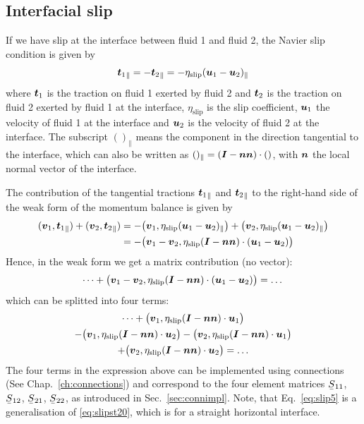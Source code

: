 \subsection{Interfacial slip}
If we have slip at the interface between fluid 1 and fluid 2, the 
 Navier slip condition is given by
\begin{equation}
   {\boldsymbol{t}_1}_\| = -{\boldsymbol{t}_2}_\| = 
   -\eta_\text{slip} (\boldsymbol{u}_1 - \boldsymbol{u}_2)_\|
   \label{eq:slip3}
\end{equation}
where $\boldsymbol{t}_1$ is the traction on fluid 1 exerted by fluid 2 and 
$\boldsymbol{t}_2$ is the traction on fluid 2 exerted by fluid 1 at the interface,
$\eta_\text{slip}$ is the slip coefficient,
$\boldsymbol{u}_1$ the velocity of fluid 1 at the interface and $\boldsymbol{u}_2$ is
the velocity of fluid 2 at the interface. The subscript $()_\|$ means the
component in the direction tangential to the interface, which can also be written
as $()_\|=(\boldsymbol{I}-\boldsymbol{n}\boldsymbol{n})\cdot()$, with $\boldsymbol{n}$ the local normal vector of the interface.

The contribution of the tangential tractions ${\boldsymbol{t}_1}_\|$ and ${\boldsymbol{t}_2}_\|$
to the right-hand side of the weak form of the momentum balance is given by
\begin{equation} 
\begin{split}
   (\boldsymbol{v}_1, {\boldsymbol{t}_1}_\|)+(\boldsymbol{v}_2, {\boldsymbol{t}_2}_\|) &=
-\big(\boldsymbol{v}_1,\eta_\text{slip} (\boldsymbol{u}_1 - \boldsymbol{u}_2)_\|\big)
+\big(\boldsymbol{v}_2,\eta_\text{slip} (\boldsymbol{u}_1 - \boldsymbol{u}_2)_\|\big)\\
&=-\big(\boldsymbol{v}_1-\boldsymbol{v}_2,\eta_\text{slip} (\boldsymbol{I}-\boldsymbol{n}\boldsymbol{n})\cdot
                            (\boldsymbol{u}_1 - \boldsymbol{u}_2)\big)
\end{split}
   \label{eq:slip4}
\end{equation}
Hence, in the weak form we get a matrix contribution (no vector):
\begin{equation}
  \dots + \big(\boldsymbol{v}_1-\boldsymbol{v}_2,\eta_\text{slip} (\boldsymbol{I}-\boldsymbol{n}\boldsymbol{n})\cdot(\boldsymbol{u}_1-\boldsymbol{u}_2)\big)=
\dots 
\end{equation}
which can be splitted into four terms:
\begin{multline}
  \dots + \big(\boldsymbol{v}_1,\eta_\text{slip} (\boldsymbol{I}-\boldsymbol{n}\boldsymbol{n})\cdot\boldsymbol{u}_1\big)\\
        - \big(\boldsymbol{v}_1,\eta_\text{slip} (\boldsymbol{I}-\boldsymbol{n}\boldsymbol{n})\cdot\boldsymbol{u}_2\big)
        - \big(\boldsymbol{v}_2,\eta_\text{slip} (\boldsymbol{I}-\boldsymbol{n}\boldsymbol{n})\cdot\boldsymbol{u}_1\big)\\
        + \big(\boldsymbol{v}_2,\eta_\text{slip} (\boldsymbol{I}-\boldsymbol{n}\boldsymbol{n})\cdot\boldsymbol{u}_2\big)=
\dots 
\label{eq:slip5}
\end{multline}
The four terms in the expression above can be implemented using connections (See Chap.~\ref{ch:connections}) and
correspond to the 
four element matrices $\mat S_{11}$, $\mat S_{12}$, $\mat S_{21}$,
$\mat S_{22}$, as introduced in Sec.~\ref{sec:connimpl}. Note, that Eq.~\eqref{eq:slip5} is a generalisation of
\eqref{eq:slipst20}, which is for a straight horizontal interface.


